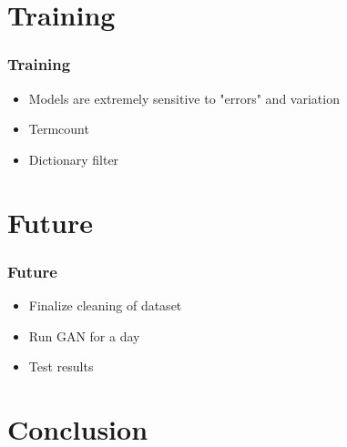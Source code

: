 \documentclass{beamer}
\begin{document}
\section{Training}

\begin{frame}
  \frametitle{Training}

  \begin{itemize}
    \item Models are extremely sensitive to "errors" and variation
    \item Termcount
    \item Dictionary filter
  \end{itemize}
\end{frame}

\section{Future}

\begin{frame}
  \frametitle{Future}

  \begin{itemize}
    \item Finalize cleaning of dataset
    \item Run GAN for a day
    \item Test results
  \end{itemize}
\end{frame}

\section{Conclusion}

\end{document}
